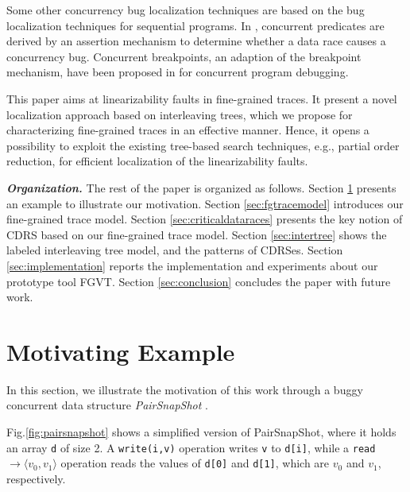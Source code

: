 \documentclass[runningheads]{llncs}
\begin{document}
Some other concurrency bug localization techniques are based on the bug localization techniques for sequential programs. In \cite{DBLP:conf/IEEEpact/GottschlichPPW13}, concurrent predicates are derived by an assertion mechanism to determine whether a data race causes a concurrency bug. Concurrent breakpoints, an adaption of the breakpoint mechanism, have been proposed in \cite{DBLP:conf/ppopp/ParkS12} for concurrent program debugging.

This paper aims at linearizability faults in fine-grained traces. It present a novel localization approach based on interleaving trees, which we propose for characterizing fine-grained traces in an effective manner. Hence, it opens a possibility to exploit the existing tree-based search techniques, e.g., partial order reduction, for efficient localization of the linearizability faults.


\noindent\textbf{\textit{Organization.}} The rest of the paper is organized as follows. Section \ref{sec:motivatingeg} presents an example to illustrate our motivation. Section \ref{sec:fgtracemodel} introduces our fine-grained trace model. Section \ref{sec:criticaldataraces} presents the key notion of CDRS based on our fine-grained trace model. Section \ref{sec:intertree} shows the labeled interleaving tree model, and the patterns of CDRSes. Section \ref{sec:implementation} reports the implementation and experiments about our prototype tool FGVT. Section \ref{sec:conclusion} concludes the paper with future work.


\section{Motivating Example}\label{sec:motivatingeg}







In this section, we illustrate the motivation of this work through a buggy concurrent data structure \textit{PairSnapShot} \cite{DBLP:conf/sac/LongZ16}.


Fig.\ref{fig:pairsnapshot} shows a simplified version of PairSnapShot, where it holds an array \texttt{d} of size 2. A \texttt{write(i,v)} operation writes \texttt{v} to \texttt{d[i]}, while a \texttt{read} \texttt{$\to \langle v_0,v_1\rangle$} operation reads the values of \texttt{d[0]} and \texttt{d[1]}, which are $v_0$ and $v_1$, respectively.
\end{document}
